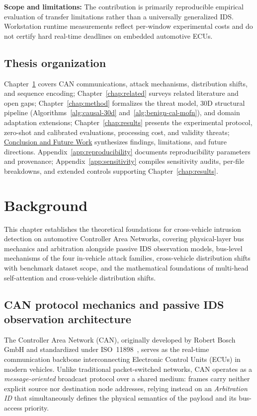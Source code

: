 \documentclass[12pt, a4paper, reqno, oneside]{book}
\newcommand\sect[1]{%
  \Needspace{5\baselineskip}%
  \phantomsection%
  \addcontentsline{toc}{section}{#1}%
  \section*{#1}%
}
\begin{document}
\noindent\textbf{Scope and limitations:} The contribution is primarily reproducible empirical evaluation of transfer limitations rather than a universally generalized IDS. Workstation runtime measurements reflect per-window experimental costs and do not certify hard real-time deadlines on embedded automotive ECUs.

\sect{Thesis organization}
Chapter~\ref{chap:background} covers CAN communications, attack mechanisms, distribution shifts, and sequence encoding; Chapter~\ref{chap:related} surveys related literature and open gaps; Chapter~\ref{chap:method} formalizes the threat model, 30D structural pipeline (Algorithms~\ref{alg:causal-30d} and~\ref{alg:benign-cal-mofn}), and domain adaptation extensions; Chapter~\ref{chap:results} presents the experimental protocol, zero-shot and calibrated evaluations, processing cost, and validity threats; \hyperref[chap:conclusion]{Conclusion and Future Work} synthesizes findings, limitations, and future directions. Appendix~\ref{app:reproducibility} documents reproducibility parameters and provenance; Appendix~\ref{app:sensitivity} compiles sensitivity audits, per-file breakdowns, and extended controls supporting Chapter~\ref{chap:results}.

\chapter{Background}\label{chap:background}
This chapter establishes the theoretical foundations for cross-vehicle intrusion detection on automotive Controller Area Networks, covering physical-layer bus mechanics and arbitration alongside passive IDS observation models, bus-level mechanisms of the four in-vehicle attack families, cross-vehicle distribution shifts with benchmark dataset scope, and the mathematical foundations of multi-head self-attention and cross-vehicle distribution shifts.

\section{CAN protocol mechanics and passive IDS observation architecture}
The Controller Area Network (CAN), originally developed by Robert Bosch GmbH and standardized under ISO~11898~\cite{bosch1991can,iso11898_1_2015,iso11898_2_2016}, serves as the real-time communication backbone interconnecting Electronic Control Units (ECUs) in modern vehicles. Unlike traditional packet-switched networks, CAN operates as a \textit{message-oriented} broadcast protocol over a shared medium: frames carry neither explicit source nor destination node addresses, relying instead on an \textit{Arbitration ID} that simultaneously defines the physical semantics of the payload and its bus-access priority.
\end{document}

